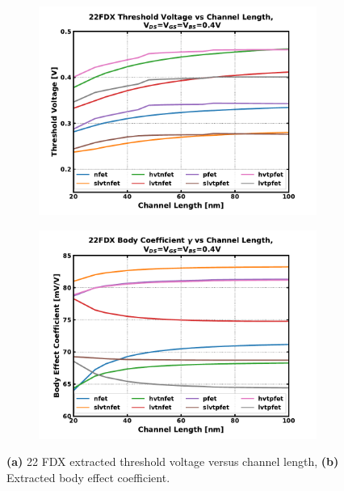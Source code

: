 		\begin{figure}[htb!]
		    \centering
		    \begin{subfigure}{0.5\textwidth}
		        \centering
		        \includegraphics[width=1\textwidth, angle=0]{./figs/design/vth}
		        \caption{ }
		        \label{fig:vth_vs_len}
		    \end{subfigure}%
		    \begin{subfigure}{0.5\textwidth}
		        \centering
		        \includegraphics[width=1\textwidth, angle=0]{./figs/design/gamma}
		        \caption{ }
		        \label{fig:gamma_vs_len}
		    \end{subfigure}
		    \label{fig:vth_groupb}
		    \caption{\textbf{(a)} 22 FDX extracted threshold voltage versus channel length, \textbf{(b)} Extracted body effect coefficient.}
		\end{figure} 


